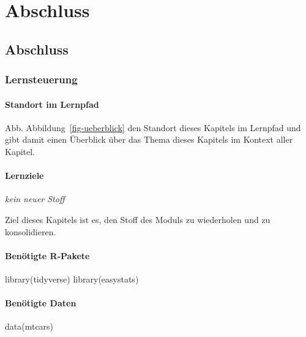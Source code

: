 \documentclass[
  a4paper,
]{scrbook}
\newenvironment{Shaded}{\begin{snugshade}}{\end{snugshade}}
\newcommand{\FunctionTok}[1]{\textcolor[rgb]{0.28,0.35,0.67}{#1}}
\newcommand{\NormalTok}[1]{\textcolor[rgb]{0.00,0.23,0.31}{#1}}
\theoremstyle{definition}
\theoremstyle{definition}
\theoremstyle{definition}
\theoremstyle{remark}
\begin{document}
\part{Abschluss}

\chapter{Abschluss}\label{abschluss-1}

\section{Lernsteuerung}\label{lernsteuerung-9}

\subsection{Standort im Lernpfad}\label{standort-im-lernpfad-2}

Abb. Abbildung~\ref{fig-ueberblick} den Standort dieses Kapitels im
Lernpfad und gibt damit einen Überblick über das Thema dieses Kapitels
im Kontext aller Kapitel.

\subsection{Lernziele}\label{lernziele-10}

\emph{kein neuer Stoff}

Ziel dieses Kapitels ist es, den Stoff des Moduls zu wiederholen und zu
konsolidieren.

\subsection{Benötigte R-Pakete}\label{benuxf6tigte-r-pakete-8}

\begin{Shaded}
\begin{Highlighting}[]
\FunctionTok{library}\NormalTok{(tidyverse)}
\FunctionTok{library}\NormalTok{(easystats)}
\end{Highlighting}
\end{Shaded}

\subsection{Benötigte Daten}\label{benuxf6tigte-daten-8}

\begin{Shaded}
\begin{Highlighting}[]

\FunctionTok{data}\NormalTok{(mtcars)}
\end{Highlighting}
\end{Shaded}
\end{document}
